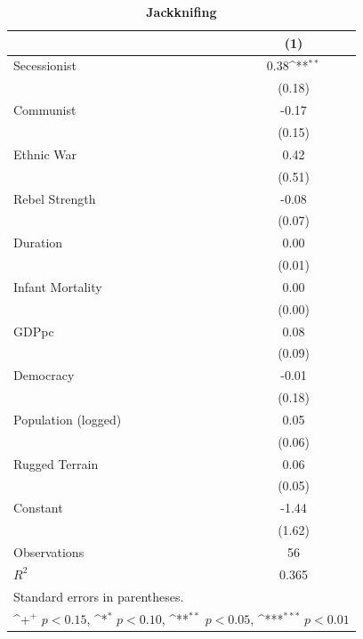 \documentclass[12pt, letterpaper]{article}
\begin{document}
\newpage
\begin{table}[htbp]\centering
\def\sym#1{\ifmmode^{#1}\else\(^{#1}\)\fi}
\renewcommand\thetable{A.\Roman{table}}
\makeatletter
\def\myrow{}
\CT@everycr{\noalign{%
\global\let\CT@row@color\relax
\stepcounter{mym6}%
\ifnum\value{mym6}=2
  \gdef\myrow{\rowcolor{gray!50}}
\else\ifnum\value{mym6}=4
  \gdef\myrow{}
\fi\fi
}\myrow}
\begin{small}
\caption{\textbf{Jackknifing }}
\label{table:jackknife}
\begin{tabular}{l*{1}{c}}
\hline\hline
                    &\multicolumn{1}{c}{(1)}\\
\hline
Secessionist      &        0.38\sym{**} \\
                    &      (0.18)         \\
Communist           &       -0.17         \\
                    &      (0.15)         \\
Ethnic War          &        0.42         \\
                    &      (0.51)         \\
Rebel Strength      &       -0.08         \\
                    &      (0.07)         \\
Duration            &        0.00         \\
                    &      (0.01)         \\
Infant Mortality    &        0.00         \\
                    &      (0.00)         \\
GDPpc               &        0.08         \\
                    &      (0.09)         \\
Democracy           &       -0.01         \\
                    &      (0.18)         \\
Population (logged) &        0.05         \\
                    &      (0.06)         \\
Rugged Terrain      &        0.06         \\
                    &      (0.05)         \\
Constant            &       -1.44         \\
                    &      (1.62)         \\
\hline
Observations        &          56         \\
\(R^{2}\)           &       0.365         \\
\hline\hline
\multicolumn{2}{l}{\footnotesize Standard errors in parentheses.}\\
\multicolumn{2}{l}{\footnotesize \sym{+} \(p<0.15\), \sym{*} \(p<0.10\), \sym{**} \(p<0.05\), \sym{***} \(p<0.01\)}\\
\end{tabular}
\end{small}
\end{table}
\end{document}
